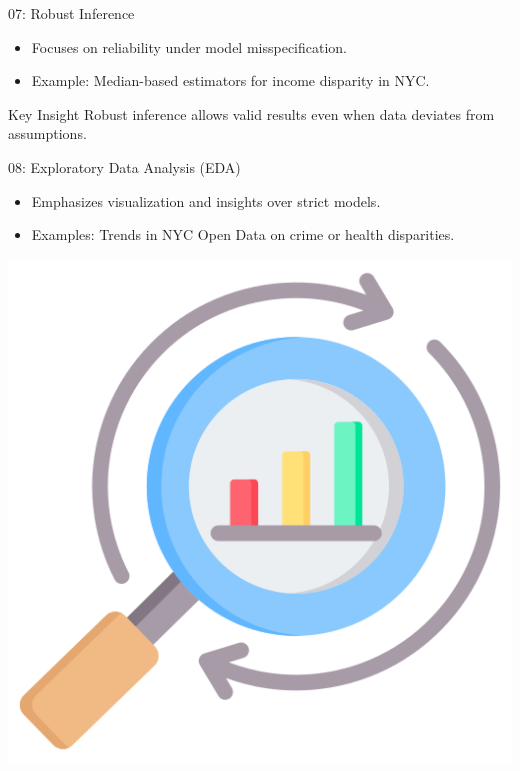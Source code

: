 \documentclass{beamer}
\begin{document}
\begin{frame}{07: Robust Inference}
\begin{itemize}
    \item Focuses on reliability under model misspecification.
    \item Example: Median-based estimators for income disparity in NYC.
\end{itemize}

\begin{block}{Key Insight}
Robust inference allows valid results even when data deviates from assumptions.
\end{block}
\end{frame}

\begin{frame}{08: Exploratory Data Analysis (EDA)}
\begin{itemize}
    \item Emphasizes visualization and insights over strict models.
    \item Examples: Trends in NYC Open Data on crime or health disparities.
\end{itemize}

\includegraphics[width=\textwidth]{example-plot.png} %
\end{frame}
\end{document}
